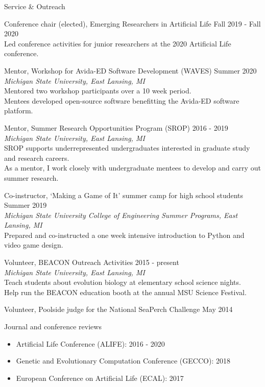 \begin{rSection}{Service \& Outreach}

Conference chair (elected), Emerging Researchers in Artificial Life
\hfill Fall 2019 - Fall 2020 \\
\tab Led conference activities for junior researchers at the 2020 Artificial Life conference.

Mentor, Workshop for Avida-ED Software Development (WAVES)
\hfill Summer 2020 \\
\tab \textit{Michigan State University, East Lansing, MI} \\
\tab Mentored two workshop participants over a 10 week period. \\
\tab Mentees developed open-source software benefitting the Avida-ED software platform.

Mentor, Summer Research Opportunities Program (SROP)
\hfill 2016 - 2019 \\
\tab \textit{Michigan State University, East Lansing, MI} \\
\tab SROP supports underrepresented undergraduates interested in graduate study and research careers. \\
\tab As a mentor, I work closely with undergraduate mentees to develop and carry out summer research.

Co-instructor, `Making a Game of It' summer camp for high school students
\hfill Summer 2019 \\
\tab \textit{Michigan State University College of Engineering Summer Programs, East Lansing, MI} \\
\tab Prepared and co-instructed a one week intensive introduction to Python and video game design.

Volunteer, BEACON Outreach Activities
\hfill 2015 - present \\
\tab \textit{Michigan State University, East Lansing, MI} \\
\tab Teach students about evolution biology at elementary school science nights. \\
\tab Help run the BEACON education booth at the annual MSU Science Festival.

Volunteer, Poolside judge for the National SeaPerch Challenge \hfill May 2014

Journal and conference reviews
\vspace{-0.5em}
\begin{itemize}[noitemsep]
  \item Artificial Life Conference (ALIFE): 2016 - 2020
  \item Genetic and Evolutionary Computation Conference (GECCO): 2018
  \item European Conference on Artificial Life (ECAL): 2017
\end{itemize}

\end{rSection}